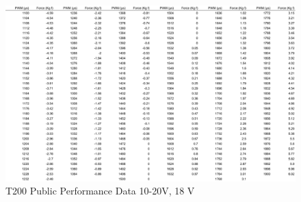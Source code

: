 \begin{figure}[H]
    \centering
    \includegraphics[width=.85\textwidth]{images/app-t200-18v.pdf}
    \caption{T200 Public Performance Data 10-20V, 18 V}
\end{figure}